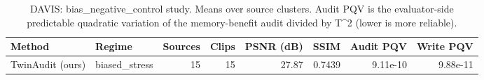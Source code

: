 \begin{table}[t]
\centering
\caption{DAVIS: bias\_negative\_control study. Means over source clusters. Audit PQV is the evaluator-side predictable quadratic variation of the memory-benefit audit divided by T^2 (lower is more reliable).}
\label{tab:bias_negative_control_DAVIS}
\small
\begin{tabular}{llrrrrrr}
\toprule
Method & Regime & Sources & Clips & PSNR (dB) & SSIM & Audit PQV & Write PQV \\
\midrule
TwinAudit (ours) & biased\_stress & 15 & 15 & 27.87 & 0.7439 & 9.11e-10 & 9.88e-11 \\
\bottomrule
\end{tabular}
\end{table}
